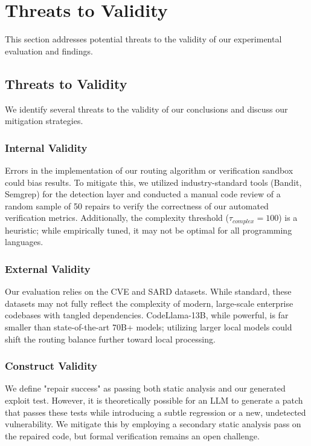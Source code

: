 \documentclass[conference]{IEEEtran}
\begin{document}
\section{Threats to Validity}

This section addresses potential threats to the validity of our experimental evaluation and findings.

\subsection{Threats to Validity}

We identify several threats to the validity of our conclusions and discuss our mitigation strategies.

\subsubsection{Internal Validity}
Errors in the implementation of our routing algorithm or verification sandbox could bias results. To mitigate this, we utilized industry-standard tools (Bandit, Semgrep) for the detection layer and conducted a manual code review of a random sample of 50 repairs to verify the correctness of our automated verification metrics. Additionally, the complexity threshold ($\tau_{complex} = 100$) is a heuristic; while empirically tuned, it may not be optimal for all programming languages.

\subsubsection{External Validity}
Our evaluation relies on the CVE and SARD datasets. While standard, these datasets may not fully reflect the complexity of modern, large-scale enterprise codebases with tangled dependencies. CodeLlama-13B, while powerful, is far smaller than state-of-the-art 70B+ models; utilizing larger local models could shift the routing balance further toward local processing.

\subsubsection{Construct Validity}
We define "repair success" as passing both static analysis and our generated exploit test. However, it is theoretically possible for an LLM to generate a patch that passes these tests while introducing a subtle regression or a new, undetected vulnerability. We mitigate this by employing a secondary static analysis pass on the repaired code, but formal verification remains an open challenge.
\end{document}
